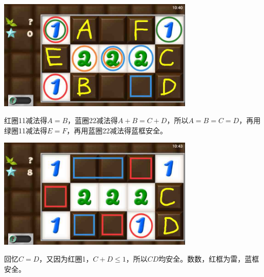 \subsection{} %
\begin{center}
    \includegraphics[width=0.7\textwidth]{puzzlelow/181-1.jpg}
\end{center}
红圈11减法得$A=B$，蓝圈22减法得$A+B=C+D$，所以$A=B=C=D$，再用绿圈11减法得$E=F$，再用蓝圈22减法得蓝框安全。
\begin{center}
    \includegraphics[width=0.7\textwidth]{puzzlelow/181-2.jpg}
\end{center}
回忆$C=D$，又因为红圈1，$C+D\le 1$，所以$CD$均安全。数数，红框为雷，蓝框安全。

